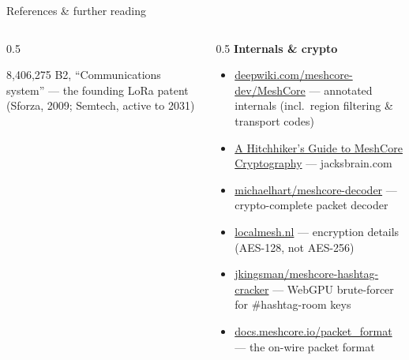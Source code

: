 \documentclass[aspectratio=\baAspect,t,9pt]{beamer}
\begin{document}
\begin{frame}[noframenumbering]{References \& further reading}
\begin{columns}[T]
\begin{column}{0.5\textwidth}
\begin{itemize}
{          8,406,275 B2, ``Communications system''} --- the founding LoRa patent
          (Sforza, 2009; Semtech, active to 2031)
      \end{itemize}
    \end{column}
    \begin{column}{0.5\textwidth}
      \textbf{Internals \& crypto}
      \begin{itemize}
        \item \href{https://deepwiki.com/meshcore-dev/MeshCore}{deepwiki.com/meshcore-dev/MeshCore}
          --- annotated internals (incl.\ region filtering \& transport codes)
        \item \href{https://jacksbrain.com/2026/01/a-hitchhiker-s-guide-to-meshcore-cryptography/}{A
          Hitchhiker's Guide to MeshCore Cryptography} --- jacksbrain.com
        \item \href{https://github.com/michaelhart/meshcore-decoder}{michaelhart/meshcore-decoder}
          --- crypto-complete packet decoder
        \item \href{https://www.localmesh.nl/en/meshcore-encryption-details/}{localmesh.nl}
          --- encryption details (AES-128, not AES-256)
        \item \href{https://github.com/jkingsman/meshcore-hashtag-cracker}{jkingsman/meshcore-hashtag-cracker}
          --- WebGPU brute-forcer for \#hashtag-room keys
        \item \href{https://docs.meshcore.io/packet_format/}{docs.meshcore.io/packet\_format}
          --- the on-wire packet format
      \end{itemize}
    \end{column}
  \end{columns}
\end{frame}
\end{document}
